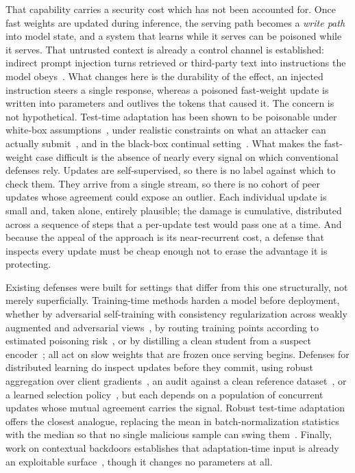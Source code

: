 \documentclass[journal]{IEEEtran}
\begin{document}
That capability carries a security cost which has not been accounted for. Once fast
weights are updated during inference, the serving path becomes a \emph{write path}
into model state, and a system that learns while it serves can be poisoned while it
serves. That untrusted context is already a control channel is established: indirect
prompt injection turns retrieved or third-party text into instructions the model
obeys~\cite{greshake2023injection}. What changes here is the durability of the
effect, an injected instruction steers a single response, whereas a poisoned
fast-weight update is written into parameters and outlives the tokens that caused
it. The concern is not hypothetical. Test-time adaptation has been shown to be
poisonable under white-box assumptions~\cite{cong2024ttp}, under realistic
constraints on what an attacker can actually submit~\cite{su2025realistic}, and in
the black-box continual setting~\cite{hoang2024rip}. What makes the fast-weight case
difficult is the absence of nearly every signal on which conventional defenses rely.
Updates are self-supervised, so there is no label against which to check them. They
arrive from a single stream, so there is no cohort of peer updates whose agreement
could expose an outlier. Each individual update is small and, taken alone, entirely
plausible; the damage is cumulative, distributed across a sequence of steps that a
per-update test would pass one at a time. And because the appeal of the approach is
its near-recurrent cost, a defense that inspects every update must be cheap enough
not to erase the advantage it is protecting.

Existing defenses were built for settings that differ from this one structurally,
not merely superficially. Training-time methods harden a model before deployment,
whether by adversarial self-training with consistency regularization across weakly
augmented and adversarial views~\cite{li2024ast}, by routing training points
according to estimated poisoning risk~\cite{bena2025risk}, or by distilling a clean
student from a suspect encoder~\cite{han2025mimic}; all act on slow weights that are
frozen once serving begins. Defenses for distributed learning do inspect updates
before they commit, using robust aggregation over client
gradients~\cite{blanchard2017krum,yin2018trimmed,yang2025scalesign,zukaib2026d3flids},
an audit against a clean reference dataset~\cite{basak2025dpad,nawshin2026concurrent},
or a learned selection policy~\cite{xu2026feddrlpd}, but each depends on a
population of concurrent updates whose mutual agreement carries the signal. Robust
test-time adaptation offers the closest analogue, replacing the mean in
batch-normalization statistics with the median so that no single malicious sample
can swing them~\cite{park2024medbn}. Finally, work on contextual backdoors
establishes that adaptation-time input is already an exploitable
surface~\cite{liu2025contextual}, though it changes no parameters at all.
\end{document}
